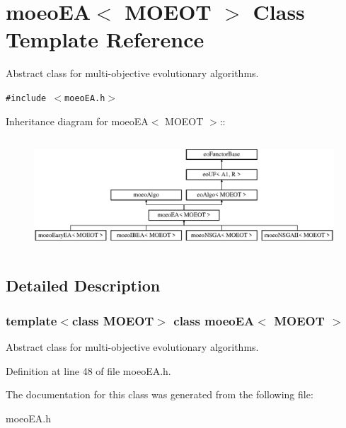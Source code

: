 \section{moeo\-EA$<$ MOEOT $>$ Class Template Reference}
\label{classmoeoEA}
Abstract class for multi-objective evolutionary algorithms.  


{\tt \#include $<$moeo\-EA.h$>$}

Inheritance diagram for moeo\-EA$<$ MOEOT $>$::\begin{figure}[H]
\begin{center}
\leavevmode
\includegraphics[height=4.24242cm]{classmoeoEA}
\end{center}
\end{figure}


\subsection{Detailed Description}
\subsubsection*{template$<$class MOEOT$>$ class moeo\-EA$<$ MOEOT $>$}

Abstract class for multi-objective evolutionary algorithms. 



Definition at line 48 of file moeo\-EA.h.

The documentation for this class was generated from the following file:\begin{CompactItemize}
\item 
moeo\-EA.h\end{CompactItemize}
